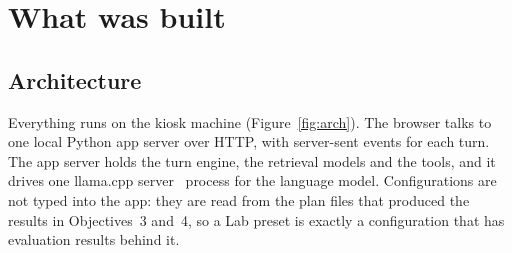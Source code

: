 \documentclass[11pt,a4paper]{article}
\begin{document}
\section{What was built}\label{sec:design}

\subsection{Architecture}
Everything runs on the kiosk machine (Figure~\ref{fig:arch}). The browser talks to one local Python app server over
HTTP, with server-sent events for each turn. The app server holds the turn engine, the retrieval models and the tools,
and it drives one llama.cpp server~\cite{llamacpp} process for the language model. Configurations are not typed into the
app: they are read from the plan files that produced the results in Objectives~3 and~4, so a Lab preset is exactly a
configuration that has evaluation results behind it.
\end{document}
